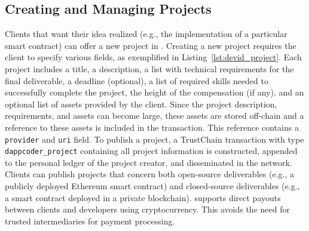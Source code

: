 \subsection{Creating and Managing Projects}
Clients that want their idea realized (e.g., the implementation of a particular smart contract) can offer a new project in \Dappcoder{}.
Creating a new project requires the client to specify various fields, as exemplified in Listing~\ref{lst:devid_project}.
Each project includes a title, a description, a list with technical requirements for the final deliverable, a deadline (optional), a list of required skills needed to successfully complete the project, the height of the compensation (if any). and an optional list of assets provided by the client.
Since the project description, requirements, and assets can become large, these assets are stored off-chain and a reference to these assets is included in the transaction.
This reference contains a \texttt{provider} and \texttt{uri} field.
To publish a project, a TrustChain transaction with type \texttt{dappcoder\_project} containing all project information is constructed, appended to the personal ledger of the project creator, and disseminated in the network.
Clients can publish projects that concern both open-source deliverables (e.g., a publicly deployed Ethereum smart contract) and closed-source deliverables (e.g., a smart contract deployed in a private blockchain).
\Dappcoder{} supports direct payouts between clients and developers using cryptocurrency.
This avoids the need for trusted intermediaries for payment processing.


